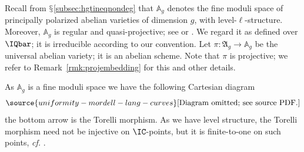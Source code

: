 
Recall from $\mathsection$\ref{subsec:hgtineqnondeg} that  $\mathbb{A}_g$ denotes the fine moduli space of principally polarized
abelian varieties of dimension $g$, with level-$\ell$-structure. Moreover,
$\mathbb{A}_g$ is  regular and quasi-projective; see
\cite[Theorem~7.9 and below]{MFK:GIT94} or \cite[Theorem 1.9]{OortSteenbrink}.
We regard it as defined over $\IQbar$;
it is irreducible according to
our convention. Let $\pi \colon \mathfrak{A}_g
\rightarrow \mathbb{A}_g$ be the universal abelian variety; it is an
abelian scheme. Note that $\pi$ is projective; we refer to
Remark~\ref{rmk:projembedding} for this and other details.

As $\mathbb{A}_g$ is a fine moduli space we have the following Cartesian diagram
\begin{equation}
\label{EqUnivJac}
\source{uniformity-mordell-lang-curves}
\begin{aligned}
\text{[Diagram omitted; see source PDF.]}
\end{aligned}
\end{equation}
the bottom arrow is the Torelli morphism. As we have level structure,
the Torelli morphism need not be injective on $\IC$-points, but it is
finite-to-one on such points, \textit{cf.} \cite[Lemma 1.11]{OortSteenbrink}.



